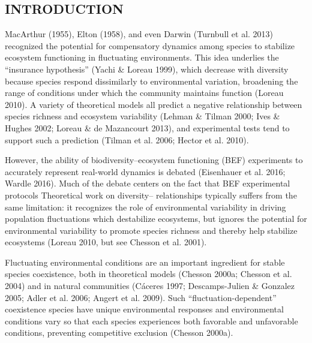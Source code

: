 \documentclass[12pt,]{article}
\begin{document}
\setlength{\parindent}{5ex}

\subsection{INTRODUCTION}\label{introduction}

MacArthur (1955), Elton (1958), and even Darwin (Turnbull et al. 2013)
recognized the potential for compensatory dynamics among species to
stabilize ecosystem functioning in fluctuating environments. This idea
underlies the ``insurance hypothesis'' (Yachi \& Loreau 1999), which
decrease with diversity because species respond dissimilarly to
environmental variation, broadening the range of conditions under which
the community maintains function (Loreau 2010). A variety of theoretical
models all predict a negative relationship between species richness and
ecosystem variability (Lehman \& Tilman 2000; Ives \& Hughes 2002;
Loreau \& de Mazancourt 2013), and experimental tests tend to support
such a prediction (Tilman et al. 2006; Hector et al. 2010).

However, the ability of biodiversity--ecosystem functioning (BEF)
experiments to accurately represent real-world dynamics is debated
(Eisenhauer et al. 2016; Wardle 2016). Much of the debate centers on the
fact that BEF experimental protocols
Theoretical work on diversity-- relationships
typically suffers from the same limitation: it recognizes the role of
environmental variability in driving population fluctuations which
destabilize ecosystems, but ignores the potential for environmental
variability to promote species richness and thereby help stabilize
ecosystems (Loreau 2010, but see Chesson et al. 2001).

Fluctuating environmental conditions are an important ingredient for
stable species coexistence, both in theoretical models (Chesson 2000a;
Chesson et al. 2004) and in natural communities (Cáceres 1997;
Descamps-Julien \& Gonzalez 2005; Adler et al. 2006; Angert et al.
2009). Such ``fluctuation-dependent'' coexistence
 species have unique environmental
responses and environmental conditions vary so that each species
experiences both favorable and unfavorable conditions, preventing
competitive exclusion (Chesson 2000a).
\end{document}
